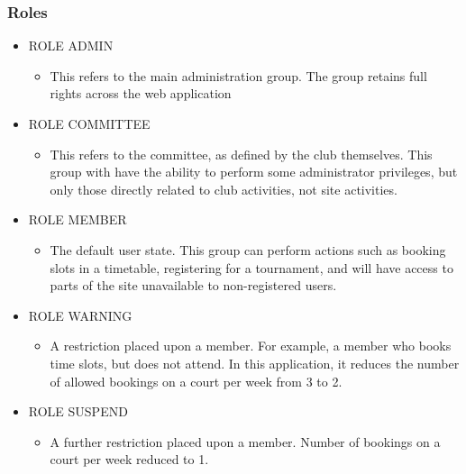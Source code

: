 \subsubsection{Roles}
\begin{itemize}
\item ROLE ADMIN
\begin{itemize}
\item This refers to the main administration group. The group retains full rights across the web application
\end{itemize}
\item ROLE COMMITTEE
\begin{itemize}
\item This refers to the committee, as defined by the club themselves. This group with have the ability to perform some administrator privileges, but only those directly related to club activities, not site activities.
\end{itemize}
\item ROLE MEMBER
\begin{itemize}
\item The default user state. This group can perform actions such as booking slots in a timetable, registering for a tournament, and will have access to parts of the site unavailable to non-registered users.
\end{itemize}
\item ROLE WARNING 
\begin{itemize}
\item A restriction placed upon a member. For example, a member who books time slots, but does not attend. In this application, it reduces the number of allowed bookings on a court per week from 3 to 2.
\end{itemize}
\item ROLE SUSPEND
\begin{itemize}
\item A further restriction placed upon a member. Number of bookings on a court per week reduced to 1.
\end{itemize}
\end{itemize}
\label{fig:secRoles}

